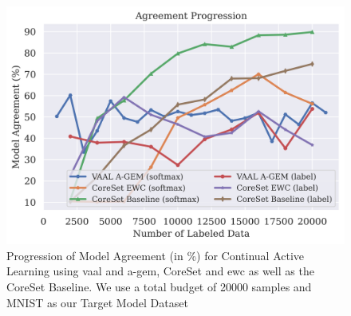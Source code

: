 \begin{figure}[h]
    \centering
    \includegraphics[width=0.7\linewidth]{images/results_CALMS/mnist_vaal_agem.png}
    \caption[Agreement Comparison for Model Stealing on MNIST using VAAL and AGEM]{Progression of Model Agreement (in \%)
    for Continual Active Learning using \gls{vaal} and \gls{a-gem}, CoreSet and \gls{ewc} as well as the CoreSet Baseline.
    We use a total budget of 20000 samples and MNIST as our Target Model Dataset}
    \label{fig:CALMSmnistVAAL_AGEM}
\end{figure}